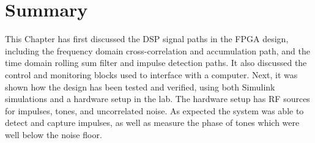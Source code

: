 \section{Summary}
This Chapter has first discussed the DSP signal paths in the FPGA design, including the frequency domain cross-correlation and accumulation path, and the time domain rolling sum filter and impulse detection paths. It also discussed the control and monitoring blocks used to interface with a computer. Next, it was shown how the design has been tested and verified, using both Simulink simulations and a hardware setup in the lab. The hardware setup has RF sources for impulses, tones, and uncorrelated noise. As expected the system was able to detect and capture impulses, as well as measure the phase of tones which were well below the noise floor.
